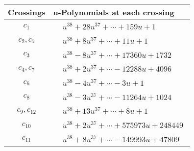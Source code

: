 \documentclass[1p]{elsarticle_modified}
\theoremstyle{definition}
\begin{document}
\begin{tabular}{m{50pt}|m{274pt}}
Crossings & \hspace{64pt}u-Polynomials at each crossing \\
\hline $$\begin{aligned}c_{1}\end{aligned}$$&$\begin{aligned}
&u^{38}+28 u^{37}+\cdots+159 u+1
\end{aligned}$\\
\hline $$\begin{aligned}c_{2},c_{5}\end{aligned}$$&$\begin{aligned}
&u^{38}+8 u^{37}+\cdots+11 u+1
\end{aligned}$\\
\hline $$\begin{aligned}c_{3}\end{aligned}$$&$\begin{aligned}
&u^{38}-8 u^{37}+\cdots+17360 u+1732
\end{aligned}$\\
\hline $$\begin{aligned}c_{4},c_{7}\end{aligned}$$&$\begin{aligned}
&u^{38}+2 u^{37}+\cdots-12288 u+4096
\end{aligned}$\\
\hline $$\begin{aligned}c_{6}\end{aligned}$$&$\begin{aligned}
&u^{38}-4 u^{37}+\cdots-3 u+1
\end{aligned}$\\
\hline $$\begin{aligned}c_{8}\end{aligned}$$&$\begin{aligned}
&u^{38}-3 u^{37}+\cdots-11264 u+1024
\end{aligned}$\\
\hline $$\begin{aligned}c_{9},c_{12}\end{aligned}$$&$\begin{aligned}
&u^{38}+13 u^{37}+\cdots+8 u+1
\end{aligned}$\\
\hline $$\begin{aligned}c_{10}\end{aligned}$$&$\begin{aligned}
&u^{38}+2 u^{37}+\cdots+575973 u+248449
\end{aligned}$\\
\hline $$\begin{aligned}c_{11}\end{aligned}$$&$\begin{aligned}
&u^{38}+8 u^{37}+\cdots-149993 u+47809
\end{aligned}$\\
\hline
\end{tabular}\\~\\
\end{document}

